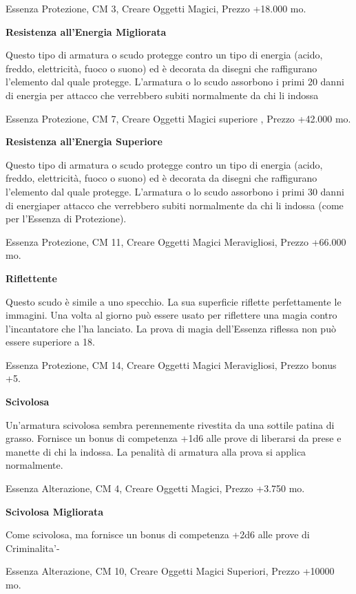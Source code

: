 \documentclass[a4paper,11pt,twoside,openany]{book}
\begin{document}
Essenza Protezione, CM 3, Creare Oggetti Magici, Prezzo +18.000 mo.

\textbf{Resistenza all'Energia Migliorata}

Questo tipo di armatura o scudo protegge contro un tipo di energia
(acido, freddo, elettricità, fuoco o suono) ed è decorata da disegni
che raffigurano l'elemento dal quale protegge. L'armatura o lo scudo
assorbono i primi 20 danni di energia per attacco che verrebbero subiti
normalmente da chi li indossa

Essenza Protezione, CM 7, Creare Oggetti Magici superiore , Prezzo
+42.000 mo.

\textbf{Resistenza all'Energia Superiore}

Questo tipo di armatura o scudo protegge contro un tipo di energia (acido, freddo, elettricità, fuoco o suono) ed è decorata da disegni che raffigurano l'elemento dal quale protegge. L'armatura o lo scudo assorbono i primi 30 danni di energiaper attacco che verrebbero subiti normalmente da chi li indossa (come per l'Essenza di Protezione).

Essenza Protezione, CM 11, Creare Oggetti Magici Meravigliosi, Prezzo +66.000 mo.

\textbf{Riflettente}

Questo scudo è simile a uno specchio. La sua superficie riflette perfettamente le immagini. Una volta al giorno può essere usato per riflettere una magia contro l'incantatore che l'ha lanciato. La prova di magia dell'Essenza riflessa non può essere superiore a 18.

Essenza Protezione, CM 14, Creare Oggetti Magici Meravigliosi, Prezzo
bonus +5.

\textbf{Scivolosa}

Un'armatura scivolosa sembra perennemente rivestita da una sottile patina di grasso. Fornisce un bonus di competenza +1d6 alle prove di liberarsi da prese e manette di chi la indossa. La penalità di armatura alla prova si applica normalmente.

Essenza Alterazione, CM 4, Creare Oggetti Magici, Prezzo +3.750 mo.

\textbf{Scivolosa Migliorata}

Come scivolosa, ma fornisce un bonus di competenza +2d6 alle prove di Criminalita'-

Essenza Alterazione, CM 10, Creare Oggetti Magici Superiori, Prezzo +10000 mo.
\end{document}
